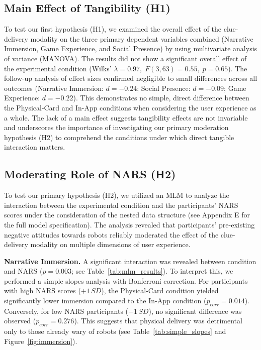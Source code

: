 \documentclass[sigconf,screen]{acmart-tagged}
\newcommand{\rev}[1]{#1}
\begin{document}
\subsection{Main Effect of Tangibility (H1)}
To test our first hypothesis (H1), we examined the overall effect of the clue-delivery modality on the three primary dependent variables combined (Narrative Immersion, Game Experience, and Social Presence) by using multivariate analysis of variance (MANOVA). The results did not show a significant overall effect of the experimental condition (Wilks' $\lambda = 0.97,\; F(3, 63) = 0.55,\; p = 0.65$). \rev{The follow-up analysis of effect sizes confirmed negligible to small differences across all outcomes (Narrative Immersion: $d=-0.24$; Social Presence: $d=-0.09$; Game Experience: $d=-0.22$).} This demonstrates no simple, direct difference between the Physical-Card and In-App conditions when considering the user experience as a whole. The lack of a main effect suggests \rev{tangibility} effects are not invariable and underscores the importance of investigating our primary moderation hypothesis (H2) to comprehend the conditions under which \rev{direct tangible interaction} matters.

\vspace{-6pt}
\subsection{Moderating Role of NARS (H2)}
To test our primary hypothesis (H2), we utilized an MLM to analyze the interaction between the experimental condition and the participants' NARS scores under the consideration of the nested data structure (see Appendix E for the full model specification). The analysis revealed that participants' pre-existing negative attitudes towards robots reliably moderated the effect of the clue-delivery modality on multiple dimensions of user experience.

\noindent \rev{\textbf{Narrative Immersion.} A significant interaction was revealed between condition and NARS ($p = 0.003$; see Table~\ref{tab:mlm_results}). To interpret this, we performed a simple slopes analysis with Bonferroni correction. For participants with high NARS scores ($+1\,SD$), the Physical-Card condition yielded significantly lower immersion compared to the In-App condition ($p_{corr} = 0.014$). Conversely, for low NARS participants ($-1\,SD$), no significant difference was observed ($p_{corr} = 0.276$). This suggests that physical delivery was detrimental only to those already wary of robots (see Table~\ref{tab:simple_slopes} and Figure~\ref{fig:immersion}).}
\end{document}
